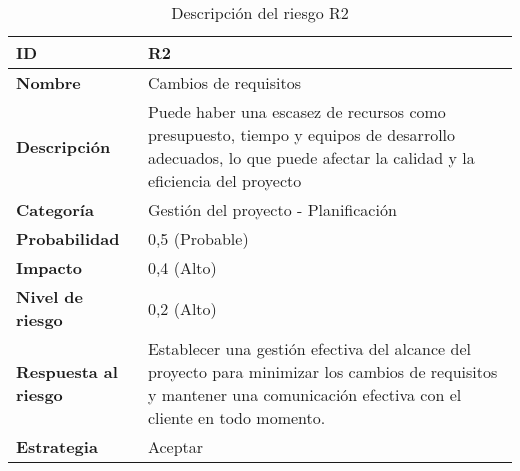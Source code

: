 \begin{table}[H]
	\centering
	\begin{tabular}{|l|m{12cm}|}
		\hline
		\textbf{ID}                  & R2                                                                                                                                                                     \\
		\hline
		\textbf{Nombre}              & Cambios de requisitos                                                                                                                                                  \\
		\hline
		\textbf{Descripción}         & Puede haber una escasez de recursos como presupuesto, tiempo y equipos de desarrollo adecuados, lo que puede afectar la calidad y la eficiencia del proyecto           \\
		\hline
		\textbf{Categoría}           & Gestión del proyecto - Planificación                                                                                                                                   \\
		\hline
		\textbf{Probabilidad}        & 0,5 (Probable)                                                                                                                                                         \\
		\hline
		\textbf{Impacto}             & 0,4 (Alto)                                                                                                                                                             \\
		\hline
		\textbf{Nivel de riesgo}     & 0,2 (Alto)                                                                                                                                                             \\
		\hline
		\textbf{Respuesta al riesgo} & Establecer una gestión efectiva del alcance del proyecto para minimizar los cambios de requisitos y mantener una comunicación efectiva con el cliente en todo momento. \\
		\hline
		\textbf{Estrategia}          & Aceptar                                                                                                                                                                \\
		\hline
	\end{tabular}
	\caption{Descripción del riesgo R2}
\end{table}

